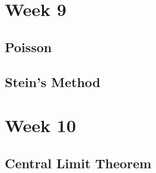 \documentclass[12pt]{article}
\begin{document}
\section{Week 9}

\subsection{Poisson}

\subsection{Stein's Method}


\section{Week 10}

\subsection{Central Limit Theorem}


\newpage
\begin{thebibliography}{99}

\end{thebibliography}
\end{document}
